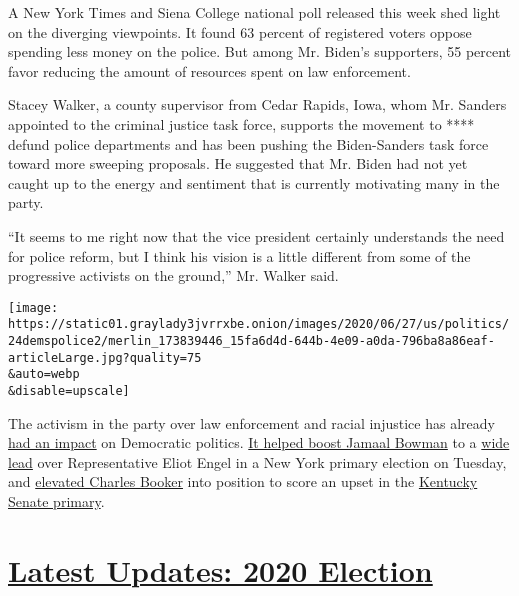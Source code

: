 A New York Times and Siena College national poll released this week shed
light on the diverging viewpoints. It found 63 percent of registered
voters oppose spending less money on the police. But among Mr. Biden's
supporters, 55 percent favor reducing the amount of resources spent on
law enforcement.

Stacey Walker, a county supervisor from Cedar Rapids, Iowa, whom Mr.
Sanders appointed to the criminal justice task force, supports the
movement to **** defund police departments and has been pushing the
Biden-Sanders task force toward more sweeping proposals. He suggested
that Mr. Biden had not yet caught up to the energy and sentiment that is
currently motivating many in the party.

``It seems to me right now that the vice president certainly understands
the need for police reform, but I think his vision is a little different
from some of the progressive activists on the ground,'' Mr. Walker said.

\texttt{[image: https://static01.graylady3jvrrxbe.onion/images/2020/06/27/us/politics/24demspolice2/merlin\_173839446\_15fa6d4d-644b-4e09-a0da-796ba8a86eaf-articleLarge.jpg?quality=75\\\&auto=webp\\\&disable=upscale]}

The activism in the party over law enforcement and racial injustice has
already
\href{https://www.nytimes3xbfgragh.onion/2020/06/26/us/politics/charles-booker-kentucky-jamaal-bowman.html}{had
an impact} on Democratic politics.
\href{https://www.nytimes3xbfgragh.onion/2020/06/24/nyregion/ny-primary-election-results.html}{It
helped boost Jamaal Bowman} to a
\href{https://www.nytimes3xbfgragh.onion/interactive/2020/06/23/us/elections/results-new-york-house-district-16-primary-election.html}{wide
lead} over Representative Eliot Engel in a New York primary election on
Tuesday, and
\href{https://www.nytimes3xbfgragh.onion/2020/06/23/us/politics/kentucky-new-york-election-recap.html}{elevated
Charles Booker} into position to score an upset in the
\href{https://www.nytimes3xbfgragh.onion/interactive/2020/06/23/us/elections/results-kentucky-senate-primary-election.html}{Kentucky
Senate primary}.

\hypertarget{latest-updates-2020-election}{%
\section{\texorpdfstring{\href{https://www.nytimes3xbfgragh.onion/2020/08/04/us/elections/primary-election-michigan-arizona-kansas.html?action=click\&pgtype=Article\&state=default\&region=MAIN_CONTENT_1\&context=storylines_live_updates}{Latest
Updates: 2020
Election}}{Latest Updates: 2020 Election}}\label{latest-updates-2020-election}}


